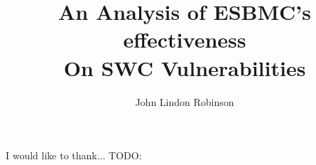 \documentclass[12pt,BSc,wordcount,twoside]{muthesis}
\begin{document}

\title{An Analysis of ESBMC's effectiveness\\
On SWC Vulnerabilities}
\author{John Lindon Robinson}

\beforeabstract




\afterabstract

I would like to thank...
TODO:
\afterpreface










\appendix

\end{document}
